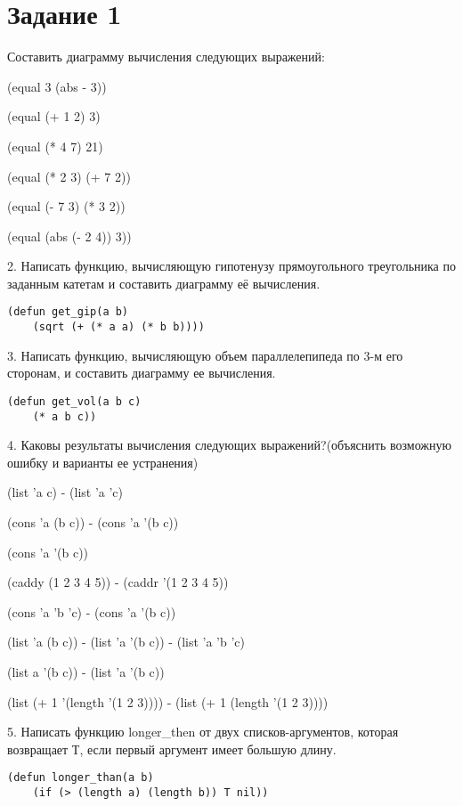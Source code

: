 \chapter*{Задание 1}
Составить диаграмму вычисления следующих выражений:

(equal 3 (abs - 3))

(equal (+ 1 2) 3) 

(equal (* 4 7) 21)

(equal (* 2 3) (+ 7 2))

(equal (- 7 3) (* 3 2))

(equal (abs (- 2 4)) 3))

2. Написать функцию, вычисляющую гипотенузу прямоугольного
треугольника по заданным катетам и составить диаграмму её вычисления.

\begin{lstlisting}[language=LISP, caption=Задание 2]
(defun get_gip(a b)
	(sqrt (+ (* a a) (* b b))))
\end{lstlisting}

3. Написать функцию, вычисляющую объем параллелепипеда по 3-м его сторонам, и
составить диаграмму ее вычисления.

\begin{lstlisting}[language=LISP, caption=Задание 3]
(defun get_vol(a b c)
	(* a b c))
\end{lstlisting}

4. Каковы результаты вычисления следующих выражений?(объяснить возможную ошибку и
варианты ее устранения)

(list 'a c) - (list 'a 'c)

(cons 'a (b c)) - (cons 'a '(b c))

(cons 'a '(b c))

(caddy (1 2 3 4 5)) - (caddr '(1 2 3 4 5))

(cons 'a 'b 'c) - (cons 'a '(b c))

(list 'a (b c)) - (list 'a '(b c)) - (list 'a 'b 'c)

(list a '(b c)) - (list 'a '(b c))

(list (+ 1 '(length '(1 2 3)))) - (list (+ 1 (length '(1 2 3))))

5. Написать функцию longer\_then от двух списков-аргументов, которая возвращает Т, если
первый аргумент имеет большую длину.

\begin{lstlisting}[language=LISP, caption=Задание 5]
(defun longer_than(a b)
	(if (> (length a) (length b)) T nil))
\end{lstlisting}

